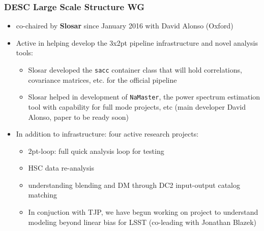 \documentclass{beamer}
\begin{document}
\begin{frame}
\frametitle {DESC Large Scale Structure WG}

\begin{itemize}  
\item co-chaired by \textbf{Slosar} since January 2016 with David
  Alonso (Oxford)

\item Active in helping develop the 3x2pt pipeline infrastructure and
  novel analysis tools:
  \begin{itemize}
  \item Slosar developed the \texttt{sacc} container class that will
    hold correlations, covariance matrices, etc. for the official
    pipeline

  \item Slosar helped in development of \texttt{NaMaster}, the power
    spectrum estimation tool with capability for full mode projects,
    etc (main developer David Alonso, paper to be ready soon)
  \end{itemize}

\item In addition to infrastructure: four active research projects:

  \begin{itemize}
  \item 2pt-loop: full quick analysis loop for testing
  \item HSC data re-analysis
  \item understanding blending and DM through DC2 input-output catalog
    matching

  \item In conjuction with TJP, we have begun working on project to
  understand modeling beyond linear bias for LSST (co-leading with
  Jonathan Blazek)

  \end{itemize}






\end{itemize}
\end{frame}
\end{document}

